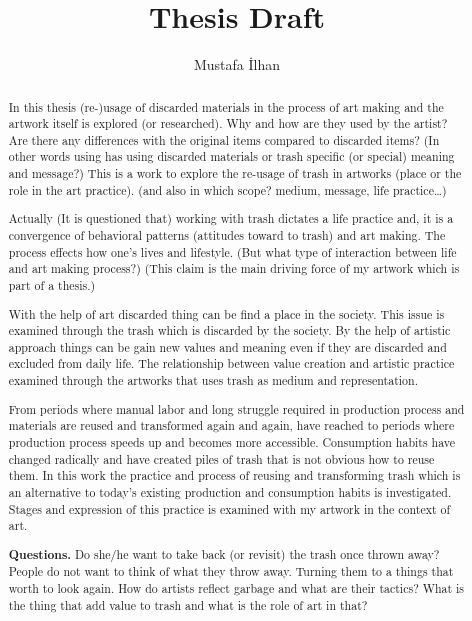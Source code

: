 \documentclass[12pt]{report}
\begin{document}
\title{Thesis Draft}
\author{Mustafa İlhan}
\maketitle
{}
\setcounter{secnumdepth}{3}
\setcounter{tocdepth}{3}
\tableofcontents

\begin{abstract}
In this thesis (re-)usage of discarded materials in the process of art making and the artwork itself is explored (or researched). Why and how are they used by the artist? Are there any differences with the original items compared to discarded items? (In other words using has using discarded materials or trash specific (or special) meaning and message?) This is a work to explore the re-usage of trash in artworks (place or the role in the art practice). (and also in which scope? medium, message, life practice\ldots) 

Actually (It is questioned that) working with trash dictates a life practice and, it is a convergence of behavioral patterns (attitudes toward to trash) and art making. The process effects how one's lives and lifestyle. (But what type of interaction between life and art making process?) (This claim is the main driving force of my artwork which is part of a thesis.)

With the help of art discarded thing can be find a place in the society. This issue is examined through the trash which is discarded by the society. By the help of artistic approach things can be gain new values and meaning even if they are discarded and excluded from daily life. The relationship between value creation and artistic practice examined through the artworks that uses trash as medium and representation.

From periods where manual labor and long struggle required in production process and materials are reused and transformed again and again, have reached to periods where production process speeds up and becomes more accessible. Consumption habits have changed radically and have created piles of trash that is not obvious how to reuse them. In this work the practice and process of reusing and transforming trash which is an alternative to today's existing production and consumption habits is investigated. Stages and expression of this practice is examined with my artwork in the context of art.

\textbf{Questions.} Do she/he want to take back (or revisit) the trash once thrown away? People do not want to think of what they throw away. Turning them to a things that worth to look again. How do artists reflect garbage and what are their tactics? What is the thing that add value to trash and what is the role of art in that?


\end{abstract}
\end{document}

